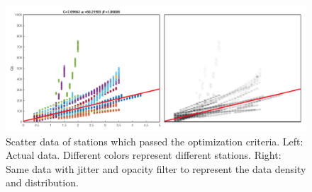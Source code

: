   \begin{figure}[ht]
    \centering
    \includegraphics[width=\textwidth]{figures/pdf/Figure_22.png}
    \caption{Scatter data of stations which passed the optimization criteria. Left: Actual data. Different colors represent different stations. Right: Same data with jitter and opacity filter to represent the data density and distribution.}
    \label{fig:results_conservative_with_regression}
\end{figure}








